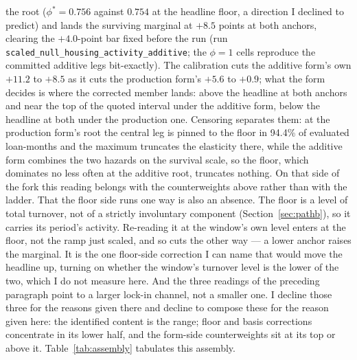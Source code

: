 \documentclass[12pt]{article}
\begin{document}
the root ($\phi^{*} = 0.756$ against $0.754$ at the headline floor, a direction I declined to predict) and lands the surviving marginal at $+8.5$ points at both anchors, clearing the $+4.0$-point bar fixed before the run (run \texttt{scaled\_null\_housing\_activity\_additive}; the $\phi = 1$ cells reproduce the committed additive legs bit-exactly). The calibration cuts the additive form's own $+11.2$ to $+8.5$ as it cuts the production form's $+5.6$ to $+0.9$; what the form decides is where the corrected member lands: above the headline at both anchors and near the top of the quoted interval under the additive form, below the headline at both under the production one. Censoring separates them: at the production form's root the central leg is pinned to the floor in 94.4\% of evaluated loan-months and the maximum truncates the elasticity there, while the additive form combines the two hazards on the survival scale, so the floor, which dominates no less often at the additive root, truncates nothing. On that side of the fork this reading belongs with the counterweights above rather than with the ladder. That the floor side runs one way is also an absence. The floor is a level of total turnover, not of a strictly involuntary component (Section~\ref{sec:pathb}), so it carries its period's activity. Re-reading it at the window's own level enters at the floor, not the ramp just scaled, and so cuts the other way --- a lower anchor raises the marginal. It is the one floor-side correction I can name that would move the headline up, turning on whether the window's turnover level is the lower of the two, which I do not measure here. And the three readings of the preceding paragraph point to a larger lock-in channel, not a smaller one. I decline those three for the reasons given there and decline to compose these for the reason given here: the identified content is the range; floor and basis corrections concentrate in its lower half, and the form-side counterweights sit at its top or above it. Table~\ref{tab:assembly} tabulates this assembly.
\end{document}
